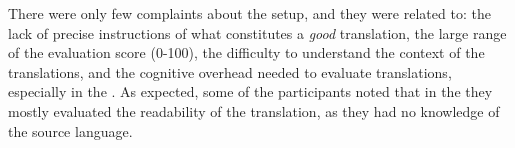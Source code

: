 
 There were only few complaints about the setup, and they were related to: \Ni the lack of precise instructions of what constitutes a \emph{good} translation, \Nii the large range of the evaluation score (0-100), \Niii the difficulty to understand the context of the translations, and \Niv the cognitive overhead needed to evaluate \llong translations, especially in the \srctgt \gamet. As expected, some of the \mono participants noted that in the \src \gamet they mostly evaluated the readability of the translation, as they had no knowledge of the source language.
\vspace{5pt}

